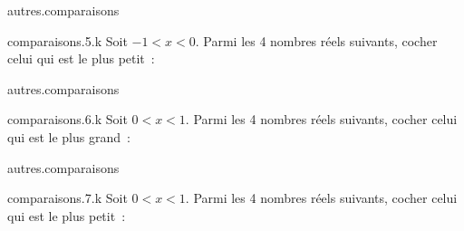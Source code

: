 \begin{qcm}{autres.comparaisons}
    \begin{question}{comparaisons.5.k}
      Soit \(-1<x<0\). Parmi les 4 nombres réels suivants, cocher celui qui est le plus petit~:
        \vspace{-0.2cm}
	\begin{reponseshoriz}       
	\end{reponseshoriz} 
    \end{question}
\end{qcm}

\begin{qcm}{autres.comparaisons}
    \begin{question}{comparaisons.6.k}
      Soit \(0<x<1\). Parmi les 4 nombres réels suivants, cocher celui qui est le plus grand~:
        \vspace{-0.2cm}
	\begin{reponseshoriz}       
	\end{reponseshoriz} 
    \end{question}
\end{qcm}

\begin{qcm}{autres.comparaisons}
    \begin{question}{comparaisons.7.k}
      Soit \(0<x<1\). Parmi les 4 nombres réels suivants, cocher celui qui est le plus petit~:
        \vspace{-0.2cm}
	\begin{reponseshoriz}       
	\end{reponseshoriz} 
    \end{question}
\end{qcm}

